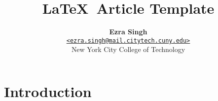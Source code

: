\documentclass[a4paper, twocolumn]{article}
\title{
    \vspace{-1.5em}
    \textbf{
        \LaTeX\ Article Template
    }
}
\author{
    \textbf{Ezra Singh} \\
    \href{mailto:ezra.singh@mail.citytech.cuny.edu}
    \texttt{<ezra.singh@mail.citytech.cuny.edu>} \\
    New York City College of Technology
}
\begin{document}
    
    \maketitle
    
    \begin{abstract} 
        
    \end{abstract}
        
    \tableofcontents
    
    \section{Introduction} \label{sec:introduction} 

    
    
    
    \appendix
    \begin{appendices}
        
    \end{appendices}    
\end{document}
